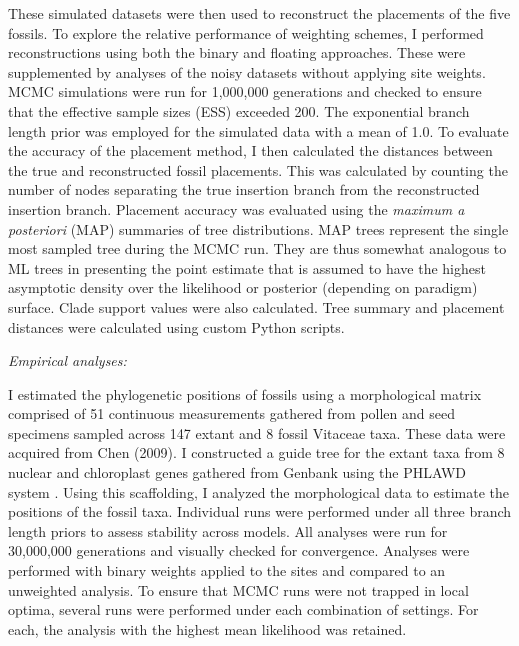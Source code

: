 \documentclass[12pt]{article}
\begin{document}
These simulated datasets were then used to reconstruct the placements of
the five fossils. To explore the relative performance of weighting
schemes, I performed reconstructions using both the binary and floating
approaches. These were supplemented by analyses of the noisy datasets
without applying site weights. MCMC simulations were run for 1,000,000
generations and checked to ensure that the effective sample sizes (ESS)
exceeded 200. The exponential branch length prior was employed for the
simulated data with a mean of 1.0. To evaluate the accuracy of the
placement method, I then calculated the distances between the true and
reconstructed fossil placements. This was calculated by counting the
number of nodes separating the true insertion branch from the
reconstructed insertion branch. Placement accuracy was evaluated using the
\emph{maximum a posteriori} (MAP) summaries of tree distributions. MAP
trees represent the single most sampled tree during the MCMC run. They
are thus somewhat analogous to ML trees in presenting the point estimate
that is assumed to have the highest asymptotic density over the
likelihood or posterior (depending on paradigm) surface. Clade support
values were also calculated. Tree summary and placement distances
were calculated using custom Python scripts.

\noindent\emph{Empirical analyses:}

I estimated the phylogenetic positions of fossils using a morphological
matrix comprised of 51 continuous measurements gathered from pollen and
seed specimens sampled across 147 extant and 8 fossil Vitaceae taxa.
These data were acquired from Chen (2009). I constructed a guide tree
for the extant taxa from 8 nuclear and chloroplast genes gathered from
Genbank using the PHLAWD system \citep{soltis2011angiosperm}.
 Using this scaffolding, I analyzed the morphological data to estimate the positions of the fossil taxa.
Individual runs were performed under all three branch length priors to
assess stability across models. All analyses were run for 30,000,000
generations and visually checked for convergence. Analyses were
performed with binary weights applied to the sites and compared to an
unweighted analysis. To ensure that MCMC runs were not trapped in local
optima, several runs were performed under each combination of settings.
For each, the analysis with the highest mean likelihood was retained.
\end{document}
